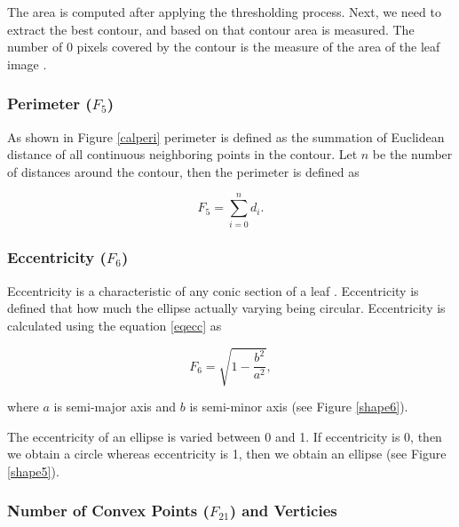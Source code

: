 \documentclass{article}
\begin{document}
The area is computed after applying the thresholding process. Next, we
need to extract the best contour, and based on that contour area is
measured. The number of 0 pixels covered by the contour is the measure of
the area of the leaf image  \citep{articlepl}. 


\hypertarget{perimeter-f_5}{%
\subsubsection{\texorpdfstring{Perimeter
(\(F_5\))}{Perimeter (F\_5)}}\label{perimeter-f_5}}

As shown in Figure \ref{calperi} perimeter is defined as the
summation of Euclidean distance of all continuous neighboring points in the contour.
Let \(n\) be the number of distances around the contour, then the
perimeter is defined as

\begin{equation}
   F_5 =  \sum_{i=0}^{n}d_i.
\label{equa_F5}
\end{equation}

\hypertarget{eccentricity-f_6}{%
\subsubsection{\texorpdfstring{Eccentricity
(\(F_6\))}{Eccentricity (F\_6)}}\label{eccentricity-f_6}}

Eccentricity is a characteristic of any conic section of a leaf
\citep{articlepl}. Eccentricity is defined that how much the ellipse
actually varying being circular. Eccentricity is calculated using
the equation \ref{eqecc} as

\begin{equation}
    F_6 = \sqrt{1-\frac{b^2}{a^2}},
    \label{eqecc}
\end{equation}

where \(a\) is semi-major axis and \(b\) is semi-minor axis (see Figure
\ref{shape6}).

The eccentricity of an ellipse is varied between 0 and 1. If
eccentricity is 0, then we obtain a circle whereas eccentricity is 1,
then we obtain an ellipse (see Figure \ref{shape5}).

\hypertarget{number-of-convex-points-f_21-and-verticies}{%
\subsubsection{\texorpdfstring{Number of Convex Points (\(F_{21}\)) and
Verticies}{Number of Convex Points (F\_\{21\}) and Verticies}}\label{number-of-convex-points-f_21-and-verticies}}
\end{document}
